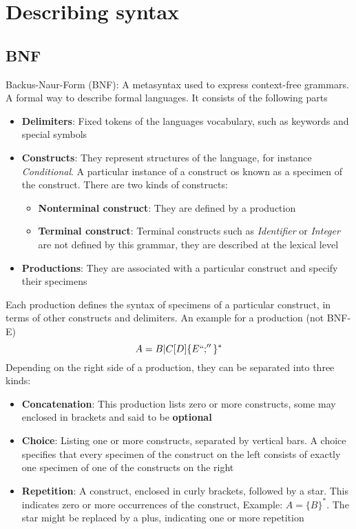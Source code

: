 \documentclass[a4paper]{article}
\begin{document}
\section{Describing syntax}
\subsection{BNF}
Backus-Naur-Form (BNF): A metasyntax used to express context-free grammars. A formal way to describe formal languages. It consists of the following parts
\begin{itemize}
\item \textbf{Delimiters}: Fixed tokens of the languages vocabulary, such as keywords and special symbols
\item \textbf{Constructs}: They represent structures of the language, for instance \emph{Conditional}. A particular instance of a construct os known as a specimen of the construct. There are two kinds of constructs:
\begin{itemize}
\item \textbf{Nonterminal construct}: They are defined by a production
\item \textbf{Terminal construct}: Terminal constructs such as \emph{Identifier} or \emph{Integer} are not defined by this grammar, they are described at the lexical level
\end{itemize}
\item \textbf{Productions}: They are associated with a particular construct and specify their specimens
\end{itemize}
Each production defines the syntax of specimens of a particular construct, in terms of other constructs and delimiters. An example for a production (not BNF-E) 
\[A=B|C[D]\{ E``;''\}^*\]
Depending on the right side of a production, they can be separated into three kinds:
\begin{itemize}
\item \textbf{Concatenation}: This production lists zero or more constructs, some may enclosed in brackets and said to be \textbf{optional}
\item\textbf{Choice}: Listing one or more constructs, separated by vertical bars. A choice specifies that every specimen of the construct on the left consists of exactly one specimen of one of the constructs on the right
\item \textbf{Repetition}: A construct, enclosed in curly brackets, followed by a star. This indicates zero or more occurrences of the construct, Example: $A=\{ B\}^*$. The star might be replaced by a plus, indicating one or more repetition
\end{itemize}
\end{document}
